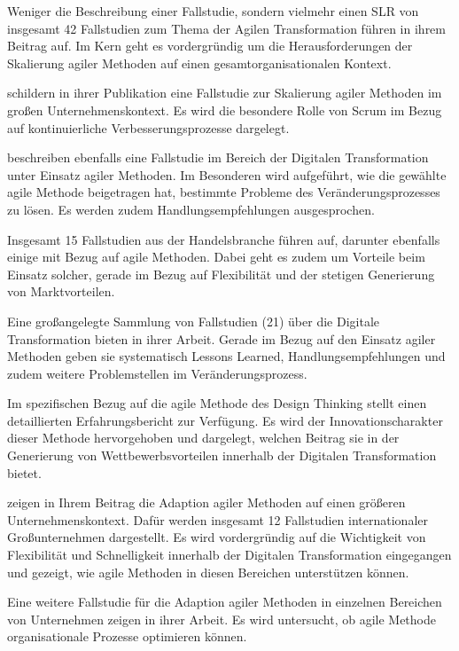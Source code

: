 Weniger die Beschreibung einer Fallstudie, sondern vielmehr einen SLR von insgesamt 42 Fallstudien zum Thema der Agilen Transformation führen  in ihrem Beitrag auf. Im Kern geht es vordergründig um die Herausforderungen der Skalierung agiler Methoden auf einen gesamtorganisationalen Kontext.

 schildern in ihrer Publikation eine Fallstudie zur Skalierung agiler Methoden im großen Unternehmenskontext. Es wird die besondere Rolle von Scrum im Bezug auf kontinuierliche Verbesserungsprozesse dargelegt.

 beschreiben ebenfalls eine Fallstudie im Bereich der Digitalen Transformation unter Einsatz agiler Methoden. Im Besonderen wird aufgeführt, wie die gewählte agile Methode  beigetragen hat, bestimmte Probleme des Veränderungsprozesses zu lösen. Es werden zudem Handlungsempfehlungen ausgesprochen.

Insgesamt 15 Fallstudien aus der Handelsbranche führen  auf, darunter ebenfalls einige mit Bezug auf agile Methoden. Dabei geht es zudem um Vorteile beim Einsatz solcher, gerade im Bezug auf Flexibilität und der stetigen Generierung von Marktvorteilen.

Eine großangelegte Sammlung von Fallstudien (21) über die Digitale Transformation bieten  in ihrer Arbeit. Gerade im Bezug auf den Einsatz agiler Methoden geben sie systematisch Lessons Learned, Handlungsempfehlungen und zudem weitere Problemstellen im Veränderungsprozess.

Im spezifischen Bezug auf die agile Methode des Design Thinking stellt  einen detaillierten Erfahrungsbericht zur Verfügung. Es wird der Innovationscharakter  dieser Methode hervorgehoben und dargelegt, welchen Beitrag sie in der Generierung von Wettbewerbsvorteilen innerhalb der Digitalen Transformation bietet.

 zeigen in Ihrem Beitrag die Adaption agiler Methoden auf einen größeren Unternehmenskontext. Dafür werden insgesamt 12 Fallstudien internationaler Großunternehmen dargestellt. Es wird vordergründig auf die Wichtigkeit von Flexibilität und Schnelligkeit innerhalb der Digitalen Transformation eingegangen und gezeigt, wie agile Methoden in diesen Bereichen unterstützen können.

Eine weitere Fallstudie für die Adaption agiler Methoden in einzelnen Bereichen von Unternehmen zeigen  in ihrer Arbeit. Es wird untersucht, ob agile Methode organisationale Prozesse optimieren können.

